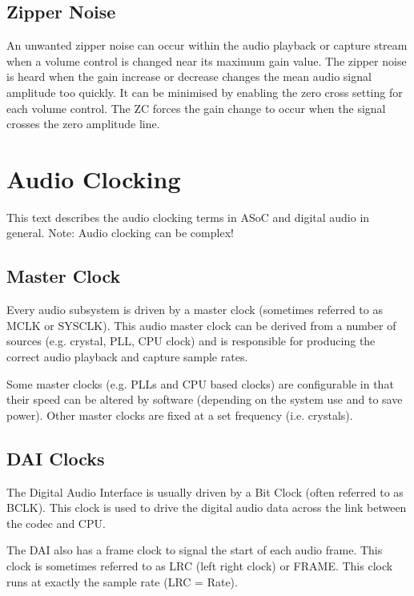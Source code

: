 \documentclass[a4paper,8pt,english]{sphinxmanual}
\begin{document}
\subsection{Zipper Noise}
\label{sound/soc/pops-clicks:zipper-noise}
An unwanted zipper noise can occur within the audio playback or capture stream
when a volume control is changed near its maximum gain value. The zipper noise
is heard when the gain increase or decrease changes the mean audio signal
amplitude too quickly. It can be minimised by enabling the zero cross setting
for each volume control. The ZC forces the gain change to occur when the signal
crosses the zero amplitude line.


\section{Audio Clocking}
\label{sound/soc/clocking::doc}\label{sound/soc/clocking:audio-clocking}
This text describes the audio clocking terms in ASoC and digital audio in
general. Note: Audio clocking can be complex!


\subsection{Master Clock}
\label{sound/soc/clocking:master-clock}
Every audio subsystem is driven by a master clock (sometimes referred to as MCLK
or SYSCLK). This audio master clock can be derived from a number of sources
(e.g. crystal, PLL, CPU clock) and is responsible for producing the correct
audio playback and capture sample rates.

Some master clocks (e.g. PLLs and CPU based clocks) are configurable in that
their speed can be altered by software (depending on the system use and to save
power). Other master clocks are fixed at a set frequency (i.e. crystals).


\subsection{DAI Clocks}
\label{sound/soc/clocking:dai-clocks}
The Digital Audio Interface is usually driven by a Bit Clock (often referred to
as BCLK). This clock is used to drive the digital audio data across the link
between the codec and CPU.

The DAI also has a frame clock to signal the start of each audio frame. This
clock is sometimes referred to as LRC (left right clock) or FRAME. This clock
runs at exactly the sample rate (LRC = Rate).
\end{document}
